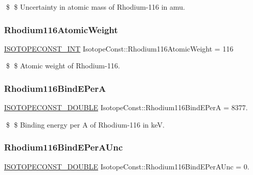 \$ \$ Uncertainty in atomic mass of Rhodium-\/116 in amu. \mbox{\label{group___isotope_const-_rhodium-_rh116_ga3c9d9ce032c5f3a81963d1c0a997f79f}} 
\subsubsection{\texorpdfstring{Rhodium116\+Atomic\+Weight}{Rhodium116AtomicWeight}}
{\footnotesize\ttfamily \mbox{\hyperlink{group___isotope_const-_macros_ga5f18360b3e99483a35c32d789e62621c}{I\+S\+O\+T\+O\+P\+E\+C\+O\+N\+S\+T\+\_\+\+I\+NT}} Isotope\+Const\+::\+Rhodium116\+Atomic\+Weight = 116}

\$ \$ Atomic weight of Rhodium-\/116. \mbox{\label{group___isotope_const-_rhodium-_rh116_ga719ca0c20cee7cc3219bfe1ad2207693}} 
\subsubsection{\texorpdfstring{Rhodium116\+Bind\+E\+PerA}{Rhodium116BindEPerA}}
{\footnotesize\ttfamily \mbox{\hyperlink{group___isotope_const-_macros_ga8f45a7272ce02c0b4c65c44636ed719a}{I\+S\+O\+T\+O\+P\+E\+C\+O\+N\+S\+T\+\_\+\+D\+O\+U\+B\+LE}} Isotope\+Const\+::\+Rhodium116\+Bind\+E\+PerA = 8377.}

\$ \$ Binding energy per A of Rhodium-\/116 in keV. \mbox{\label{group___isotope_const-_rhodium-_rh116_ga1dcc3b38765f6f3431eee76b75fd64fb}} 
\subsubsection{\texorpdfstring{Rhodium116\+Bind\+E\+Per\+A\+Unc}{Rhodium116BindEPerAUnc}}
{\footnotesize\ttfamily \mbox{\hyperlink{group___isotope_const-_macros_ga8f45a7272ce02c0b4c65c44636ed719a}{I\+S\+O\+T\+O\+P\+E\+C\+O\+N\+S\+T\+\_\+\+D\+O\+U\+B\+LE}} Isotope\+Const\+::\+Rhodium116\+Bind\+E\+Per\+A\+Unc = 0.}


